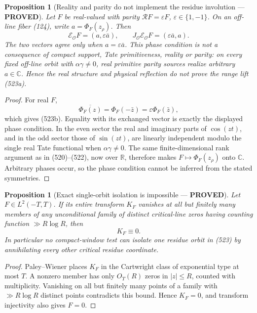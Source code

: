 \documentclass[11pt]{article}
\newtheorem{proposition}[theorem]{Proposition}
\newcommand{\PROVED}{\textcolor{green!45!black}{\textbf{PROVED}}}
\begin{document}
\begin{proposition}[Reality and parity do not implement the residue
involution --- \PROVED]
Let \(F\) be real-valued with parity
\(\mathcal RF=\varepsilon F\), \(\varepsilon\in\{1,-1\}\).  On an off-line
fiber (124), write \(a=\Phi_F(z_\rho)\).  Then
\begin{equation}
 \mathcal E_{\mathcal O}F=(a,\varepsilon\bar a),
 \qquad
 J_{\mathcal O}\mathcal E_{\mathcal O}F
   =(\varepsilon\bar a,a).                            \tag{523b}
\end{equation}
The two vectors agree only when \(a=\varepsilon\bar a\).  This phase
condition is not a consequence of compact support, Tate primitiveness,
reality or parity: on every fixed off-line orbit with
\(\alpha\gamma\ne0\), real primitive parity sources realize arbitrary
\(a\in\mathbb C\).  Hence the real structure and physical reflection do
not prove the range lift (523a).
\end{proposition}

\begin{proof}
For real \(F\),
\[
 \overline{\Phi_F(z)}
 =\Phi_F(-\bar z)
 =\varepsilon\Phi_F(\bar z),
\]
which gives (523b).  Equality with its exchanged vector is exactly the
displayed phase condition.  In the even sector the real and imaginary
parts of \(\cos(zt)\), and in the odd sector those of \(\sin(zt)\), are
linearly independent modulo the single real Tate functional when
\(\alpha\gamma\ne0\).  The same finite-dimensional rank argument as in
(520)--(522), now over \(\mathbb R\), therefore makes
\(F\mapsto\Phi_F(z_\rho)\) onto \(\mathbb C\).  Arbitrary phases occur, so
the phase condition cannot be inferred from the stated symmetries.
\end{proof}

\begin{proposition}[Exact single-orbit isolation is impossible ---
\PROVED]
Let \(F\in L^2(-T,T)\).  If its entire transform \(K_F\) vanishes at all
but finitely many members of any unconditional family of distinct
critical-line zeros having counting function \(\gg R\log R\), then
\begin{equation}
 K_F\equiv0.                                             \tag{524}
\end{equation}
In particular no compact-window test can isolate one residue orbit in
(523) by annihilating every other critical residue coordinate.
\end{proposition}

\begin{proof}
Paley--Wiener places \(K_F\) in the Cartwright class of exponential type at
most \(T\).  A nonzero member has only \(O_T(R)\) zeros in \(|z|\le R\),
counted with multiplicity.  Vanishing on all but finitely many points of a
family with \(\gg R\log R\) distinct points contradicts this bound.  Hence
\(K_F=0\), and transform injectivity also gives \(F=0\).
\end{proof}
\end{document}
